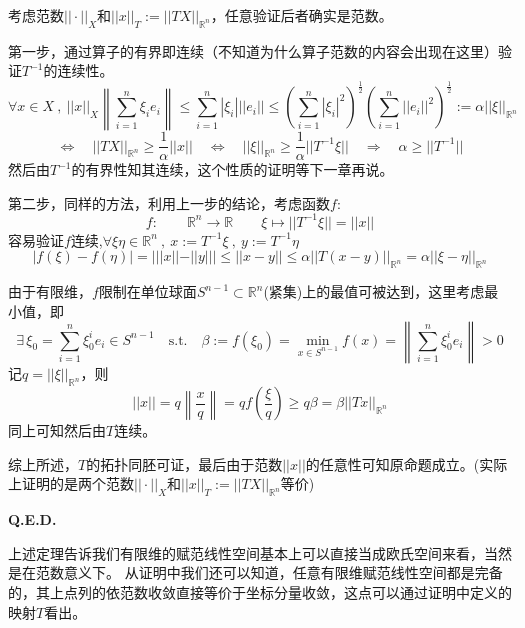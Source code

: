 考虑范数$||\cdot||_X$和$||x||_T:=||TX||_{\mathbb{R}^n}$，任意验证后者确实是范数。

第一步，通过算子的有界即连续（不知道为什么算子范数的内容会出现在这里）验证$T^{-1}$的连续性。
\[\forall x \in X \ , \ ||x||_X\left\|\sum_{i=1}^n\xi_ie_i\right\| \leq \sum_{i=1}^n|\xi_i|||e_i|| \leq \left(\sum_{i=1}^n|\xi_i|^2\right)^{\frac{1}{2}}\left(\sum_{i=1}^n||e_i||^2\right)^{\frac{1}{2}}:=\alpha||\xi||_{\mathbb{R}^n}\]
\[\Leftrightarrow \quad ||TX||_{\mathbb{R}^n} \geq \frac{1}{\alpha}||x|| \quad \Leftrightarrow \quad ||\xi||_{\mathbb{R}^n} \geq \frac{1}{\alpha}||T^{-1}\xi|| \quad \Rightarrow \quad \alpha \geq ||T^{-1}||\]
然后由$T^{-1}$的有界性知其连续，这个性质的证明等下一章再说。

第二步，同样的方法，利用上一步的结论，考虑函数$f$:
\[f: \qquad \mathbb{R}^n \to \mathbb{R} \qquad \xi \mapsto ||T^{-1}\xi||=||x||\]
容易验证$f$连续,$\forall \xi \eta \in \mathbb{R}^n \ , \ x:=T^{-1}\xi \ , \ y:=T^{-1}\eta$
\[|f(\xi)-f(\eta)|=|||x||-||y||| \leq ||x-y|| \leq \alpha ||T(x-y)||_{\mathbb{R}^n}=\alpha ||\xi-\eta||_{\mathbb{R}^n}\]

由于有限维，$f$限制在单位球面$S^{n-1} \subset \mathbb{R}^n$(紧集)上的最值可被达到，这里考虑最小值，即
\[\exists \, \xi_0=\sum_{i=1}^n\xi_0^ie_i \in S^{n-1} \quad \text{s.t.} \quad \beta:=f(\xi_0)=\mathop \text{min}\limits_{x \in S^{n-1}}f(x)=\left\|\sum_{i=1}^n\xi_0^ie_i\right\|>0\]
记$q=||\xi||_{\mathbb{R}^n}$，则
\[||x||=q\left\|\frac{x}{q}\right\|=qf\left(\frac{\xi}{q}\right) \geq q\beta=\beta||Tx||_{\mathbb{R}^n}\]
同上可知然后由$T$连续。

综上所述，$T$的拓扑同胚可证，最后由于范数$||x||$的任意性可知原命题成立。(实际上证明的是两个范数$||\cdot||_X$和$||x||_T:=||TX||_{\mathbb{R}^n}$等价)

\textbf{Q.E.D.}

上述定理告诉我们有限维的赋范线性空间基本上可以直接当成欧氏空间来看，当然是在范数意义下。
从证明中我们还可以知道，任意有限维赋范线性空间都是完备的，其上点列的依范数收敛直接等价于坐标分量收敛，这点可以通过证明中定义的映射$T$看出。

